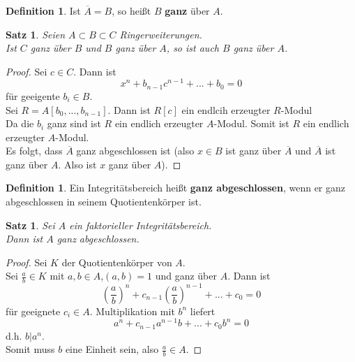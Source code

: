 \documentclass[10pt,a4paper]{article}
\newcommand{\ol}[1]{\overline{#1}}
\theoremstyle{plain}
\newtheorem{satz}[theorem]{Satz}
\theoremstyle{definition}
\newtheorem{definition}[theorem]{Definition}
\theoremstyle{remark}
\begin{document}
	\begin{definition}
		Ist $\ol A=B$, so heißt $B$ \textbf{ganz} über $A$.
	\end{definition}

	\begin{satz}
		Seien $A\subset B\subset C$ Ringerweiterungen.\\
		Ist $C$ ganz über $B$ und $B$ ganz über $A$, so ist auch $B$ ganz über $A$.
	\end{satz}

	\begin{proof}
		Sei $c\in C$. Dann ist
		\[x^n+b_{n-1}c^{n-1}+...+b_0=0\]
		für geeigente $b_i\in B$.\\
		Sei $R=A[b_0,...,b_{n-1}]$. Dann ist $R[c]$ ein endlcih erzeugter $R$-Modul\\
		Da die $b_i$ ganz sind ist $R$ ein endlich erzeugter $A$-Modul. Somit ist $R$ ein endlich erzeugter $A$-Modul.\\
		Es folgt, dass $\ol A$  ganz abgeschlossen ist (also $x\in B$ ist ganz über $\ol A$ und $\ol A$ ist ganz über $A$. Also ist $x$ ganz über $A$).
	\end{proof}

	\begin{definition}
		Ein Integritätsbereich heißt \textbf{ganz abgeschlossen}, wenn er ganz abgeschlossen in seinem Quotientenkörper ist.
	\end{definition}

	\begin{satz}
		Sei $A$ ein faktorieller Integritätsbereich.\\
		Dann ist $A$ ganz abgeschlossen.
	\end{satz}
	\begin{proof}
		Sei $K$ der Quotientenkörper von $A$.\\
		Sei $\frac{a}{b}\in K$ mit $a,b\in A$,$(a,b)=1$ und ganz über $A$. Dann ist
		\[(\frac{a}{b})^n+c_{n-1}(\frac{a}{b})^{n-1}+...+c_0=0\]
		für geeignete $c_i\in A$.
		Multiplikation mit $b^n$ liefert
		\[a^n+c_{n-1}a^{n-1}b+...+c_0b^n=0\]
		d.h. $b|a^n$.\\
		Somit muss $b$ eine Einheit sein, also $\frac{a}{b}\in A$.
	\end{proof}
\end{document}
